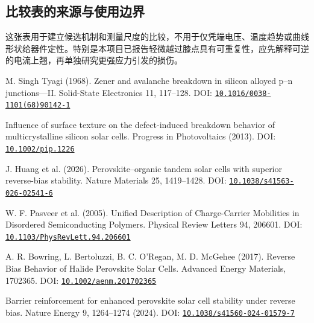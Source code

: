 \subsection*{{\cjkfont 比较表的来源与使用边界}\allowbreak{}}
{\cjkfont 这张表用于建立候选机制和测量尺度的比较，不用于仅凭端电压、温度趋势或曲线形状给器件定性。特别是本项目已报告轻微越过膝点具有可重复性，应先解释可逆的电流上翘，再单独研究更强应力引发的损伤。}\allowbreak{}\par\medskip
\noindent [C1] M. Singh Tyagi (1968). Zener and avalanche breakdown in silicon alloyed p–n junctions—II. Solid-State Electronics 11, 117–128. DOI: \href{https://doi.org/10.1016/0038-1101(68)90142-1}{\nolinkurl{10.1016/0038-1101(68)90142-1}}\par\smallskip
\noindent [C2] Influence of surface texture on the defect-induced breakdown behavior of multicrystalline silicon solar cells. Progress in Photovoltaics (2013). DOI: \href{https://doi.org/10.1002/pip.1226}{\nolinkurl{10.1002/pip.1226}}\par\smallskip
\noindent [C3] J. Huang et al. (2026). Perovskite–organic tandem solar cells with superior reverse-bias stability. Nature Materials 25, 1419–1428. DOI: \href{https://doi.org/10.1038/s41563-026-02541-6}{\nolinkurl{10.1038/s41563-026-02541-6}}\par\smallskip
\noindent [C4] W. F. Pasveer et al. (2005). Unified Description of Charge-Carrier Mobilities in Disordered Semiconducting Polymers. Physical Review Letters 94, 206601. DOI: \href{https://doi.org/10.1103/PhysRevLett.94.206601}{\nolinkurl{10.1103/PhysRevLett.94.206601}}\par\smallskip
\noindent [C5] A. R. Bowring, L. Bertoluzzi, B. C. O'Regan, M. D. McGehee (2017). Reverse Bias Behavior of Halide Perovskite Solar Cells. Advanced Energy Materials, 1702365. DOI: \href{https://doi.org/10.1002/aenm.201702365}{\nolinkurl{10.1002/aenm.201702365}}\par\smallskip
\noindent [C6] Barrier reinforcement for enhanced perovskite solar cell stability under reverse bias. Nature Energy 9, 1264–1274 (2024). DOI: \href{https://doi.org/10.1038/s41560-024-01579-7}{\nolinkurl{10.1038/s41560-024-01579-7}}\par\smallskip
{}\clearpage
